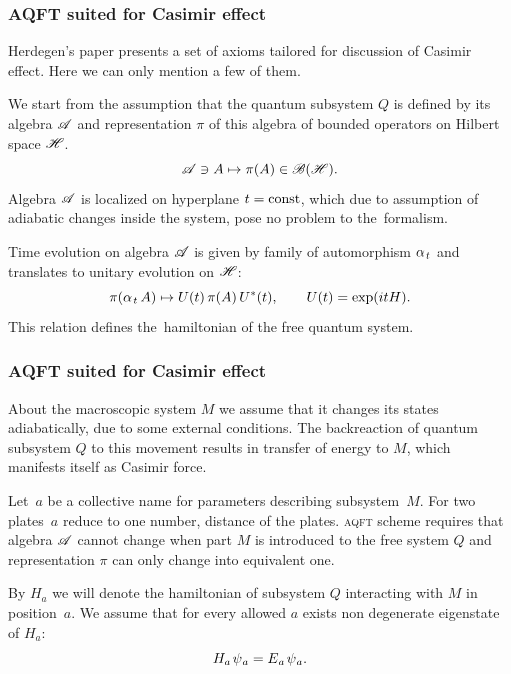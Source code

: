 \documentclass[10pt,t]{beamer}
\begin{document}
\begin{frame}
  \frametitle{AQFT suited for Casimir effect}


  Herdegen's paper
  \parencite{Herdegen-Quantum-backreaction-ETC-Part-I-Pub-2005}
  presents a set of axioms tailored for discussion of Casimir effect.
  Here we can only mention a few of them.

  We start from the assumption that the quantum subsystem $Q$ is defined by
  its algebra $\mathcal{A}$ and representation $\pi$ of this algebra of bounded
  operators on Hilbert space $\mathcal{H}$.
  \begin{equation}
    \label{eq:Overview-of-Herdegens-approach-ETC-07}
    \mathcal{A} \ni A \mapsto \pi( A ) \in \mathcal{B}( \mathcal{H} ).
  \end{equation}
  Algebra $\mathcal{A}$ is localized on hyperplane $t = \textrm{const}$, which due to
  assumption of adiabatic changes inside the system, pose no problem to
  the~formalism.

  Time evolution on algebra $\mathcal{A}$ is given by family of automorphism
  $\alpha_{ \hspace{0.09em} t }$ and translates to unitary evolution on $\mathcal{H}$:
  \begin{equation}
    \label{eq:Overview-of-Herdegens-approach-ETC-07}
    \pi( \alpha_{ \hspace{0.09em} t } \, A ) \mapsto U( t ) \, \pi( A ) \, U^{ * }( t ), \qquad
    U( t ) = \exp( i t H ).
  \end{equation}
  This relation defines the~hamiltonian of the free quantum system.

\end{frame}





\begin{frame}
  \frametitle{AQFT suited for Casimir effect}


  About the macroscopic system $M$ we assume that it changes its states
  adiabatically, due to some external conditions. The backreaction of
  quantum subsystem $Q$ to this movement results in transfer of energy to
  $M$, which manifests itself as Casimir force.

  Let~$a$ be a collective name for parameters describing subsystem~$M$. For
  two plates~$a$ reduce to one number, distance of the plates.
  \textsc{aqft} scheme requires that algebra $\mathcal{A}$ cannot change when
  part $M$ is introduced to the free system $Q$ and representation $\pi$
  can only change into equivalent one.

  By $H_{ a }$ we will denote the hamiltonian of subsystem $Q$ interacting
  with $M$ in position~$a$. We assume that for every allowed $a$ exists
  non degenerate eigenstate of $H_{ a }$:
  \begin{equation}
    \label{eq:Overview-of-Herdegens-approach-ETC-07}
    H_{ a } \hspace{0.11em} \psi_{ \hspace{0.05em} a } =
    E_{ \hspace{0.05em} a } \hspace{0.11em} \psi_{ \hspace{0.05em} a }.
  \end{equation}

\end{frame}
\end{document}
